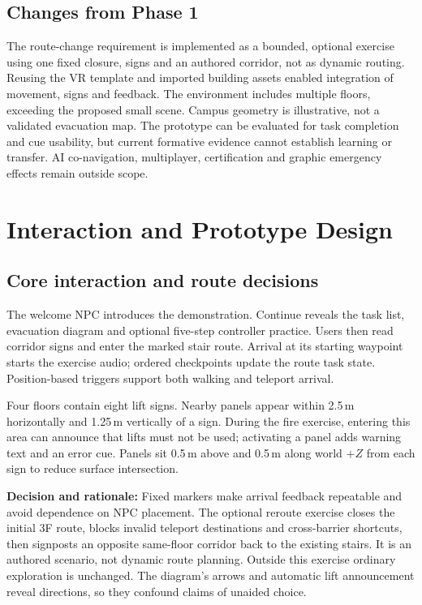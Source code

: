 \documentclass[12pt,a4paper]{article}
\begin{document}
\subsection{Changes from Phase 1}
The route-change requirement is implemented as a bounded, optional exercise
using one fixed closure, signs and an authored corridor, not as dynamic
routing. Reusing the VR template and imported building assets enabled
integration of movement, signs and feedback. The environment includes multiple
floors, exceeding the proposed small scene. Campus geometry is illustrative,
not a validated evacuation map. The prototype can be evaluated
for task completion and cue usability, but current formative evidence cannot
establish learning or transfer. AI co-navigation, multiplayer, certification
and graphic emergency effects remain outside scope.

\newpage
\section{Interaction and Prototype Design}
\subsection{Core interaction and route decisions}
The welcome NPC introduces the demonstration. Continue reveals the task list,
evacuation diagram and optional five-step controller practice. Users then read
corridor signs and enter the marked stair route. Arrival at its starting
waypoint starts the exercise audio; ordered checkpoints update the route task
state. Position-based triggers support both walking and teleport arrival.

Four floors contain eight lift signs. Nearby panels appear within 2.5\,m
horizontally and 1.25\,m vertically of a sign. During the fire exercise,
entering this area can announce that lifts must not be used; activating a panel
adds warning text and an error cue. Panels sit 0.5\,m above and 0.5\,m along
world $+Z$ from each sign to reduce surface intersection.

\textbf{Decision and rationale:} Fixed markers make arrival feedback repeatable
and avoid dependence on NPC placement. The optional reroute exercise closes
the initial 3F route, blocks invalid teleport destinations and cross-barrier
shortcuts, then signposts an opposite same-floor corridor back to the existing
stairs. It is an authored scenario, not dynamic route planning. Outside this
exercise ordinary exploration is unchanged. The diagram's arrows and automatic
lift announcement reveal directions, so they confound claims of unaided choice.
\end{document}
